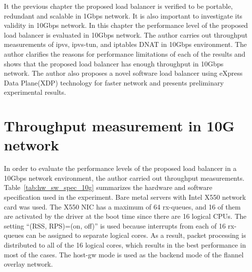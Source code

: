 
It the previous chapter the proposed load balancer is verified to be portable, redundant and scalable in 1Gbps network.
It is also important to investigate its validity in 10Gbps network.
In this chapter the performance level of the proposed load balancer is evaluated in 10Gbps network.
The author carries out throughput measurements of ipvs, ipvs-tun, and iptables DNAT in 10Gbps environment.
The author clarifies the reasons for performance limitations of each of the results and shows that the proposed load balancer has enough throughput in 10Gbps network.
The author also proposes a novel software load balancer using eXpress Data Plane(XDP) technology for faster network and presents preliminary experimental results.

\section{Throughput measurement in 10G network}

In order to evaluate the performance levels of the proposed load balancer in a 10Gbps network environment, the author carried out throughput measurements.
Table~\ref{tab:hw_sw_spec_10g} summarizes the hardware and software specification used in the experiment.
Bare metal servers with Intel X550 network card was used.
The X550 NIC has a maximum of 64 rx-queues, and 16 of them are activated by the driver at the boot time since there are 16 logical CPUs.
The setting \enquote{(RSS, RPS)=(on, off)} is used because interrupts from each of 16 rx-queues can be assigned to separate logical cores.
As a result, packet processing is distributed to all of the 16 logical cores, which results in the best performance in most of the cases.
The host-gw mode is used as the backend mode of the flannel overlay network.

